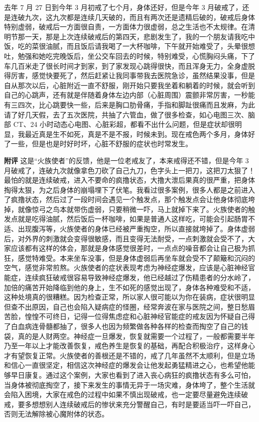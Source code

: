 \begin{case}
    去年 7 月 27 日到今年 3 月初戒了七个月，身体还好，但是今年 3 月破戒了，还是连破九次，这九次都是连续几天破的，而且有两次还是遗精后破的，破戒后身体特别虚弱，破戒后一方面很自责，一方面体力很虚弱，总之生活也不太规律。在清明节那一天，那是上次连续破戒后的第四天，悲剧发生了，我的一个朋友请我吃中饭，吃的菜很油腻，而且饭后请我喝了一大杯咖啡，下午就开始难受了，头晕很想吐，勉强和她吃完晚饭后，坐公交车回去的时候，特别难受，心慌胸闷头痛，下了车几百米走了很长时间才到家，到了家发现心跳得很快，而且浑身无力，全身虚脱得厉害，感觉快要死了，然后赶紧让我同事带我去医院急诊，虽然结果没事，但是自从那次以后，心脏附近一直不舒服，刚开始只要我坐着和躺着的时候，就会听到自己的心跳声，还有就是伴随着身体左边内部（心脏周围）震颤非常厉害，一秒能有三四次，比心跳要快一些，后来是胸口肋骨痛，手指和脚趾很痛而且发麻，为此请了好几天假，去了五次医院，共抽了六管血，做了很多检查，如心电图三次、脑部 CT、24 小时动态心电图、心脏彩超，都看不出什么问题，但是症状却很明显，我最近真是生不如死，真是不是不报，时候未到。现在戒色两个多月，身体好了一些，但是也是时好时坏，心脏不舒服的症状也时常发生。

    \textbf{附评} 这是“火族使者”的反馈，他是一位老戒友了，本来戒得还不错，但是今年 3 月破戒了，连破九次就像拿色刀砍了自己九刀，色字头上一把刀，这把刀太狠了！最怕的就是连续破戒，进入不要命的疯撸状态，大撸大泄后果真的很严重，把身体掏得太狠，为之后身体的崩塌埋下了伏笔。我看过很多案例，很多人都是之前进入了疯撸状态，然后过了一段时间会遇见一个触发点，那个触发点会让他身体彻底垮掉，就像惊弓之鸟本就带伤虚弱，只要稍微一吓，马上就掉下来了。火族使者的触发点就是吃得油腻，然后饭后一杯咖啡，如果是普通人这样吃，可能会引起肠胃不适、出现腹泻等，火族使者的身体已经被严重掏空，所以直接就垮掉了。身体虚弱后，对外界的刺激就会变得很敏感，而且变得无法耐受，一点刺激就会受不了，大家应该都有这样的体会，那就是身体感觉很差时，一点点的噪音都会让自己极为抓狂，感觉特难受。本来坐车没事，但是身体虚弱后再坐车就会受不了颠簸和沉闷的空气，感觉非常煎熬。火族使者的症状表现考虑为神经症爆发，应该是心脏神经官能症，连续疯狂破戒很容易导致神经症爆发，他已经越过了伤精患者的分水岭了，加倍的痛苦开始降临到他的身上，生不如死的感觉出现了，身体各种难受和不适，这种处境真的很糟糕。因为检查正常，所以家人很可能以为你在装病，症状很明显但查不出原因，自己也会陷入疑病症的怪圈，经常奔波在家与医院之间，整日愁眉苦脸，惶惶不可终日，记得一位得焦虑症和心脏神经官能症的戒友因为怀疑自己得了白血病连骨髓都抽了，很多人也因为频繁做各种各样的检查而掏空了自己的钱袋，真的是人财两空。神经症一旦爆发，恢复就需要一个过程了，一般都需要半年乃至一年以上才能改善恢复，戒色养生是恢复的基础，再配合积极治疗，这样身心才有望恢复正常。火族使者的善根还是不错的，戒了几年虽然不太顺利，但是立场和信心一直很坚定，相信这次神经症的爆发会让他发起勇猛精进之心，也希望他能够早日康复。通过这个案例，大家也看到了进入丧心病狂的疯撸状态有多么可怕，当身体被彻底掏空了，接下来发生的事情无异于一场灾难，身体垮了，整个生活就会陷入困境，大家在戒色的过程中如果不慎出现破戒，也一定要尽量避免连续破戒，要多想想别人连续破戒后的惨状来充分警醒自己，有时是要适当吓一吓自己，否则无法解除被心魔附体的状态。
\end{case}


